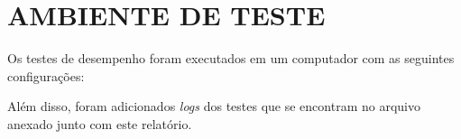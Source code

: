 \section{\normalsize AMBIENTE DE TESTE}
	Os testes de desempenho foram executados em um computador com as seguintes configurações:
	
	
	Além disso, foram adicionados \textit{logs} dos testes que se encontram no arquivo anexado junto com este relatório.